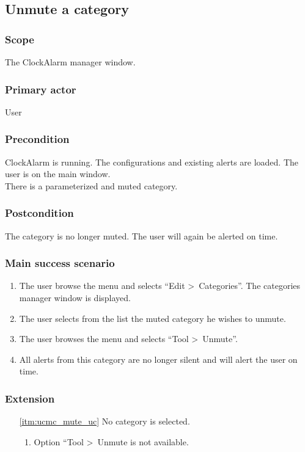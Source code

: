 \subsection{Unmute a category}

\subsubsection{Scope}
The ClockAlarm manager window.
\subsubsection{Primary actor}
User
\subsubsection{Precondition}
ClockAlarm is running. The configurations and existing alerts are loaded. The user is on the main window.
\\There is a parameterized and muted category.
\subsubsection{Postcondition}
The category is no longer muted. The user will again be alerted on time.
\subsubsection{Main success scenario}
\begin{enumerate}
	\item The user browse the menu and selects ``Edit \textgreater~Categories''. The categories manager window is displayed. 
	\item The user selects from the list the muted category he wishes to unmute.
	\item \label{itm:ucmc_mute_uc}The user browses the menu and selects ``Tool \textgreater~Unmute''.
	\item All alerts from this category are no longer silent and will alert the user on time.
\end{enumerate}
\subsubsection{Extension}
\begin{enumerate}
	\item[\ref{itm:ucmc_mute_uc}] No category is selected.
	\begin{enumerate}[i]
		\item Option ``Tool \textgreater~Unmute is not available.
	\end{enumerate}
\end{enumerate}